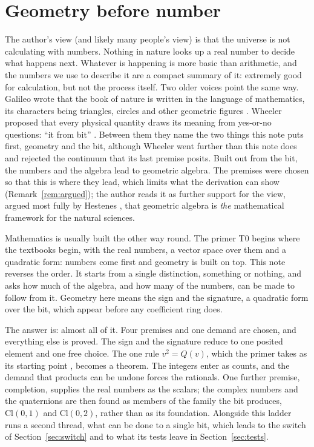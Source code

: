\documentclass[11pt]{article}
\theoremstyle{plain}
\theoremstyle{definition}
\theoremstyle{plain}
\theoremstyle{definition}
\newcommand{\Cl}{\mathrm{Cl}}
\begin{document}
\newpage
\section{Geometry before number}\label{sec:bit}

The author's view (and likely many people's view) is that the universe is not calculating with numbers. Nothing in nature looks up a real number to decide what happens next. Whatever is happening is more basic than arithmetic, and the numbers we use to describe it are a compact summary of it: extremely good for calculation, but not the process itself. Two older voices point the same way. Galileo wrote that the book of nature is written in the language of mathematics, its characters being triangles, circles and other geometric figures \cite{Galileo1623}. Wheeler proposed that every physical quantity draws its meaning from yes-or-no questions: ``it from bit'' \cite{Wheeler1990}. Between them they name the two things this note puts first, geometry and the bit, although Wheeler went further than this note does and rejected the continuum that its last premise posits. Built out from the bit, the numbers and the algebra lead to geometric algebra. The premises were chosen so that this is where they lead, which limits what the derivation can show (Remark~\ref{rem:argued}); the author reads it as further support for the view, argued most fully by Hestenes \cite{Hestenes2003Oersted}, that geometric algebra is \emph{the} mathematical framework for the natural sciences.

Mathematics is usually built the other way round. The primer T0 \cite{ButlerT0} begins where the textbooks begin, with the real numbers, a vector space over them and a quadratic form: numbers come first and geometry is built on top. This note reverses the order. It starts from a single distinction, something or nothing, and asks how much of the algebra, and how many of the numbers, can be made to follow from it. Geometry here means the sign and the signature, a quadratic form over the bit, which appear before any coefficient ring does.

The answer is: almost all of it. Four premises and one demand are chosen, and everything else is proved. The sign and the signature reduce to one posited element and one free choice. The one rule $v^{2} = Q(v)$, which the primer takes as its starting point \cite[Section 2]{ButlerT0}, becomes a theorem. The integers enter as counts, and the demand that products can be undone forces the rationals. One further premise, completion, supplies the real numbers as the scalars; the complex numbers and the quaternions are then found as members of the family the bit produces, $\Cl(0,1)$ and $\Cl(0,2)$, rather than as its foundation. Alongside this ladder runs a second thread, what can be done to a single bit, which leads to the switch of Section~\ref{sec:switch} and to what its tests leave in Section~\ref{sec:tests}.
\end{document}
